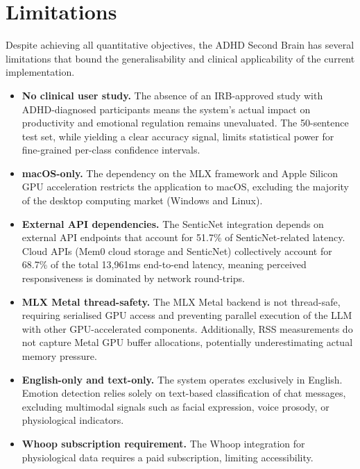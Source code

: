 \section{Limitations}
\label{sec:limitations}

Despite achieving all quantitative objectives, the ADHD Second Brain has several limitations that bound the generalisability and clinical applicability of the current implementation.

\begin{itemize}
    \item \textbf{No clinical user study.} The absence of an IRB-approved study with ADHD-diagnosed participants means the system's actual impact on productivity and emotional regulation remains unevaluated. The 50-sentence test set, while yielding a clear accuracy signal, limits statistical power for fine-grained per-class confidence intervals.

    \item \textbf{macOS-only.} The dependency on the MLX framework and Apple Silicon GPU acceleration restricts the application to macOS, excluding the majority of the desktop computing market (Windows and Linux).

    \item \textbf{External API dependencies.} The SenticNet integration depends on external API endpoints that account for 51.7\% of SenticNet-related latency. Cloud APIs (Mem0 cloud storage and SenticNet) collectively account for 68.7\% of the total 13,961ms end-to-end latency, meaning perceived responsiveness is dominated by network round-trips.

    \item \textbf{MLX Metal thread-safety.} The MLX Metal backend is not thread-safe, requiring serialised GPU access and preventing parallel execution of the LLM with other GPU-accelerated components. Additionally, RSS measurements do not capture Metal GPU buffer allocations, potentially underestimating actual memory pressure.

    \item \textbf{English-only and text-only.} The system operates exclusively in English. Emotion detection relies solely on text-based classification of chat messages, excluding multimodal signals such as facial expression, voice prosody, or physiological indicators.

    \item \textbf{Whoop subscription requirement.} The Whoop integration for physiological data requires a paid subscription, limiting accessibility.
\end{itemize}

